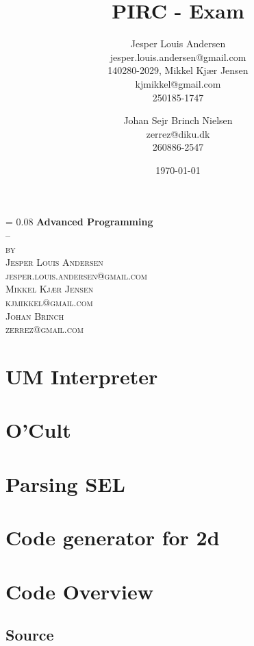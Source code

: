 \documentclass[a4paper, oneside, 10pt, draft]{memoir}
\author{Jesper Louis
  Andersen\\jesper.louis.andersen@gmail.com\\140280-2029,
  Mikkel Kj\ae r Jensen \\ kjmikkel@gmail.com\\250185-1747 \and
  Johan Sejr Brinch Nielsen \\ zerrez@diku.dk \\ 260886-2547
}
\title{PIRC - Exam}
\date{\today}
\makeatletter
\renewcommand*{\titleM}{\begingroup%
  \drop = 0.08\textheight
  \centering
  {\Huge\bfseries Advanced Programming}\\[\baselineskip]
  {\scshape --}\\[\baselineskip]
  {\scshape by}\\[\baselineskip]
  {\large\scshape Jesper Louis Andersen\\jesper.louis.andersen@gmail.com}\\[\baselineskip]
  {\large\scshape Mikkel Kj\ae r Jensen\\kjmikkel@gmail.com}\\[\baselineskip]
  {\large\scshape Johan Brinch\\zerrez@gmail.com}\\[\baselineskip]
  \endgroup}
\makeatother
\begin{document}
\titleM
\listoffixmes
\tableofcontents

\chapter{UM Interpreter}
\label{chap:task+1}

\chapter{O'Cult}
\label{chap:ocult}

\chapter{Parsing SEL}


\chapter{Code generator for 2d}
\label{compiler}








\appendix
\clearpage
\chapter{Code Overview}

\section{Source}
\end{document}
